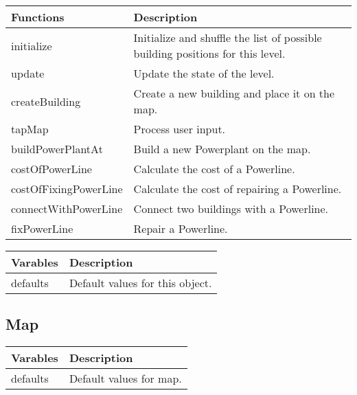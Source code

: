 	\begin{table}[H]
	\begin{tabular}{p{4cm} | p{8cm} }
	\hline
	\rowcolor{gray}
	Functions & Description \\ \hline
	initialize & Initialize and shuffle the list of possible building positions for this level. \\ \hline
	update & Update the state of the level. \\ \hline
	createBuilding & Create a new building and place it on the map. \\ \hline
	tapMap & Process user input. \\ \hline
	buildPowerPlantAt & Build a new Powerplant on the map. \\ \hline
	costOfPowerLine & Calculate the cost of a Powerline. \\ \hline
	costOfFixingPowerLine & Calculate the cost of repairing a Powerline. \\ \hline
	connectWithPowerLine & Connect two buildings with a Powerline. \\ \hline
	fixPowerLine & Repair a Powerline. \\ \hline
	\end{tabular}
	\end{table}

	\begin{table}[H]
	\begin{tabular}{p{4cm} | p{8cm} }
	\hline
	\rowcolor{gray}
	Varables & Description \\ \hline
	defaults & Default values for this object. \\ \hline
	\end{tabular}
	\end{table}
	
\subsection*{Map}

	\begin{table}[H]
	\begin{tabular}{p{4cm} | p{8cm} }
	\hline
	\rowcolor{gray}
	Varables & Description \\ \hline
	defaults & Default values for map. \\ \hline
	\end{tabular}
	\end{table}

